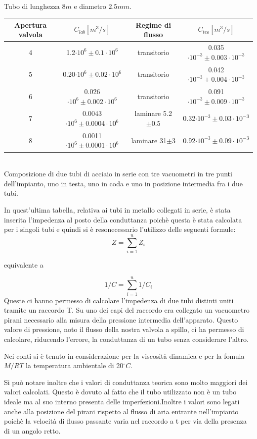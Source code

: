 \documentclass[a4paper,11pt]{article}
\begin{document}
\begin{center}
\begin{tabular}{|c|c|c|c|}
\hline 
\end{tabular}\\
\vspace{5pt}
Tubo di lunghezza $8m$ e diametro $2.5mm$.
\\
\vspace{15pt}
\begin{tabular}{|c|c|c|c|}
\hline Apertura valvola & $C_{lab} [m^3/s]$ & Regime di flusso & $C_{teo} [m^3/s]$ \\ 
\hline 4 & 1.2$\cdot10^{6}\pm 0.1\cdot10^{6} $ & transitorio & 0.035 $\cdot10^{-3}\pm 0.003\cdot10^{-3}$ \\ 
\hline 5 & 0.20$\cdot10^{6}\pm 0.02\cdot10^{6}$ & transitorio & 0.042 $\cdot10^{-3}\pm 0.004\cdot10^{-3}$\\ 
\hline 6 & 0.026$\cdot10^{6}\pm 0.002\cdot10^{6}$ & transitorio & 0.091$\cdot10^{-3}\pm 0.009\cdot10^{-3}$ \\
\hline 7 & 0.0043$\cdot10^{6}\pm 0.0004\cdot10^{6}$ & laminare 5.2$\pm0.5$ & 0.32$\cdot10^{-3}\pm 0.03\cdot10^{-3}$ \\
\hline 8 & 0.0011$\cdot10^{6}\pm 0.0001\cdot10^{6}$ & laminare 31$\pm3$ & 0.92$\cdot10^{-3}\pm 0.09\cdot10^{-3}$ \\ 
\hline 
\end{tabular}\\
\vspace{5pt}
Composizione di due tubi di acciaio in serie con tre vacuometri in tre punti dell'impianto, uno in testa, uno in coda e uno in posizione intermedia fra i due tubi.
\vspace{10pt}
\end{center}
In quest'ultima tabella, relativa ai tubi in metallo collegati in serie, è stata inserita l'impedenza al posto della conduttanza poichè questa è stata calcolata per i singoli tubi e quindi si è resonecessario l'utilizzo delle seguenti formule: $$Z=\sum_{i=1}^{n}Z_i $$ \begin{center}equivalente a\end{center}  $$ 1/C=\sum_{i=1}^{n}1/C_i $$
Queste ci hanno permesso di calcolare l'impedenza di due tubi distinti uniti tramite un raccordo T. Su uno dei capi del raccordo era collegato un vacuometro pirani necessario alla misura della pressione intermedia dell'apparato. Questo valore di pressione, noto il flusso della nostra valvola a spillo, ci ha permesso di calcolare, riducendo l'errore, la conduttanza di un tubo senza considerare l'altro.

Nei conti si è tenuto in considerazione per la viscosità dinamica e per la fomula $ M/RT $ la temperatura ambientale di 20$^\circ C$.

Si può notare inoltre che i valori di conduttanza teorica sono molto maggiori dei valori calcolati. Questo è dovuto al fatto che il tubo utilizzato non è un tubo ideale ma al suo interno presenta delle imperfezioni.Inoltre i valori sono legati anche alla posizione del pirani rispetto al flusso di aria entrante nell'impianto poichè la velocità di flusso passante varia nel raccordo a t per via della presenza di un angolo retto.
\end{document}
